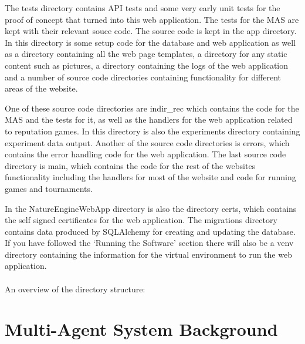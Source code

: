 \documentclass[]{final_report}
\begin{document}
The tests directory contains API tests and some very early unit tests for the proof of concept that turned into this web application. The tests for the MAS are kept with their relevant souce code. The source code is kept in the app directory. In this directory is some setup code for the database and web application as well as a directory containing all the web page templates, a directory for any static content such as pictures, a directory containing the logs of the web application and a number of source code directories containing functionality for different areas of the website.\par 
One of these source code directories are indir\_rec which contains the code for the MAS and the tests for it, as well as the handlers for the web application related to reputation games. In this directory is also the experiments directory containing experiment data output. Another of the source code directories is errors, which contains the error handling code for the web application. The last source code directory is main, which contains the code for the rest of the websites functionality including the handlers for most of the website and code for running games and tournaments.\par 
In the NatureEngineWebApp directory is also the directory certs, which contains the self signed certificates for the web application. The migrations directory contains data produced by SQLAlchemy for creating and updating the database. If you have followed the `Running the Software' section there will also be a venv directory containing the information for the virtual environment to run the web application.\\\\
An overview of the directory structure:\\

\section{Multi-Agent System Background}
\end{document}
